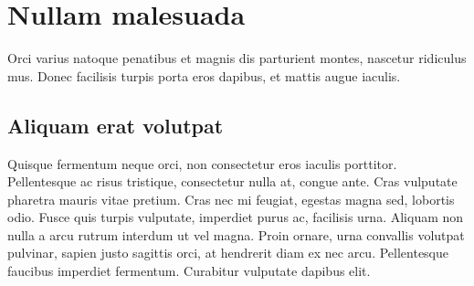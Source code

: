 

\chapter{Nullam malesuada}


Orci varius natoque penatibus et magnis dis parturient montes, nascetur ridiculus mus. Donec facilisis turpis porta eros dapibus, et mattis augue iaculis.

\section{Aliquam erat volutpat}

Quisque fermentum neque orci, non consectetur eros iaculis porttitor. Pellentesque ac risus tristique, consectetur nulla at, congue ante. Cras vulputate pharetra mauris vitae pretium. Cras nec mi feugiat, egestas magna sed, lobortis odio. Fusce quis turpis vulputate, imperdiet purus ac, facilisis urna. Aliquam non nulla a arcu rutrum interdum ut vel magna. Proin ornare, urna convallis volutpat pulvinar, sapien justo sagittis orci, at hendrerit diam ex nec arcu. Pellentesque faucibus imperdiet fermentum. Curabitur vulputate dapibus elit. 
